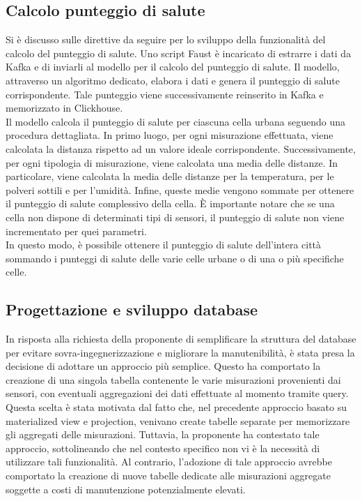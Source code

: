 \documentclass{article}
\begin{document}
    \subsection{Calcolo punteggio di salute}
    Si è discusso sulle direttive da seguire per lo sviluppo della funzionalità del calcolo del punteggio di salute. Uno script Faust è incaricato di estrarre i dati da Kafka e di inviarli al modello per il calcolo del punteggio di salute. Il modello, attraverso un algoritmo dedicato, elabora i dati e genera il punteggio di salute corrispondente. Tale punteggio viene successivamente reinserito in Kafka e memorizzato in Clickhouse. \\
    Il modello calcola il punteggio di salute per ciascuna cella urbana seguendo una procedura dettagliata. In primo luogo, per ogni misurazione effettuata, viene calcolata la distanza rispetto ad un valore ideale corrispondente. Successivamente, per ogni tipologia di misurazione, viene calcolata una media delle distanze. In particolare, viene calcolata la media delle distanze per la temperatura, per le polveri sottili e per l'umidità. Infine, queste medie vengono sommate per ottenere il punteggio di salute complessivo della cella. È importante notare che se una cella non dispone di determinati tipi di sensori, il punteggio di salute non viene incrementato per quei parametri. \\
    In questo modo, è possibile ottenere il punteggio di salute dell'intera città sommando i punteggi di salute delle varie celle urbane o di una o più specifiche celle.

    \subsection{Progettazione e sviluppo database}
    In risposta alla richiesta della proponente di semplificare la struttura del database per evitare sovra-ingegnerizzazione e migliorare la manutenibilità, è stata presa la decisione di adottare un approccio più semplice. Questo ha comportato la creazione di una singola tabella contenente le varie misurazioni provenienti dai sensori, con eventuali aggregazioni dei dati effettuate al momento tramite query. Questa scelta è stata motivata dal fatto che, nel precedente approccio basato su materialized view e projection, venivano create tabelle separate per memorizzare gli aggregati delle misurazioni. Tuttavia, la proponente ha contestato tale approccio, sottolineando che nel contesto specifico non vi è la necessità di utilizzare tali funzionalità. Al contrario, l'adozione di tale approccio avrebbe comportato la creazione di nuove tabelle dedicate alle misurazioni aggregate soggette a costi di manutenzione potenzialmente elevati.
\end{document}
